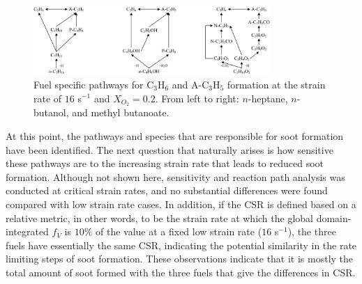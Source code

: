 \documentclass[review,3p,times]{elsarticleUS}
\begin{document}
\begin{figure}[ht]
  \centering
  \scriptsize
  \includegraphics[width=0.8\textwidth]{Pathways_Fuel.png}
  \normalsize
  \caption{Fuel specific pathways for C$_3$H$_6$ and A-C$_3$H$_5$ formation at the strain rate of $16$ s$^{-1}$ and $X_{O_2}=0.2$. From left to right: $n$-heptane, $n$-butanol, and methyl butanoate.}
  \label{fig:Pathways_Fuel}
\end{figure}

At this point, the pathways and species that are responsible for soot formation have been identified. The next question that naturally arises is how sensitive these pathways are to the increasing strain rate that leads to reduced soot formation. Although not shown here, sensitivity and reaction path analysis was conducted at critical strain rates, and no substantial differences were found compared with low strain rate cases. In addition, if the CSR is defined based on a relative metric, in other words, to be the strain rate at which the global domain-integrated $f_V$ is $10\%$ of the value at a fixed low strain rate ($16$ s$^{-1}$), the three fuels have essentially the same CSR, indicating the potential similarity in the rate limiting steps of soot formation. These observations indicate that it is mostly the total amount of soot formed with the three fuels that give the differences in CSR.

\end{document}
